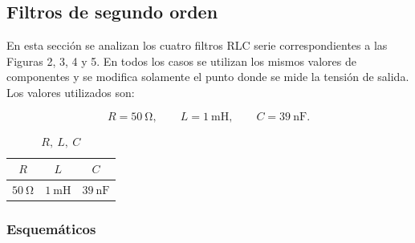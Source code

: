 \subsection{Filtros de segundo orden}

En esta sección se analizan los cuatro filtros RLC serie correspondientes a las Figuras 2, 3, 4 y 5. En todos los casos se utilizan los mismos valores de componentes y se modifica solamente el punto donde se mide la tensión de salida. Los valores utilizados son:

\begin{equation}
    R=\SI{50}{\ohm}, \qquad
    L=\SI{1}{\milli\henry}, \qquad
    C=\SI{39}{\nano\farad}.
\end{equation}

\begin{table}[H]
\centering
\caption{$R,\ L,\ C$}
\label{tab:RLC}
\begin{tabular}{ccc}
\toprule
$R$ & $L$ & $C$ \\
\midrule
$\SI{50}{\ohm}$ & $\SI{1}{\milli\henry}$ & $\SI{39}{\nano\farad}$ \\
\bottomrule
\end{tabular}
\end{table}

\subsubsection{Esquemáticos}

